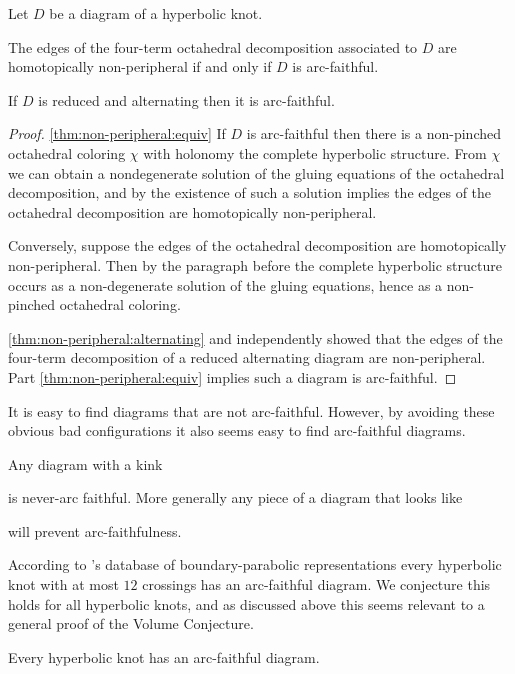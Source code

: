 \documentclass[leqno]{sl2art}
\begin{document}
\begin{corollary}
  \label{thm:non-peripheral}
  Let \(D\) be a diagram of a hyperbolic knot.
  \begin{thmenum}
  \item
    \label{thm:non-peripheral:equiv}
    The edges of the four-term octahedral decomposition associated to \(D\) are homotopically non-peripheral if and only if \(D\) is arc-faithful.
  \item
    \label{thm:non-peripheral:alternating}
    If \(D\) is reduced and alternating then it is arc-faithful.
    \qedhere
  \end{thmenum}
\end{corollary}
\begin{proof}
  \ref{thm:non-peripheral:equiv}
  If \(D\) is arc-faithful then there is a non-pinched octahedral coloring \(\chi\) with holonomy the complete hyperbolic structure.
  From \(\chi\) we can obtain a nondegenerate solution of the gluing equations of the octahedral decomposition, and by \cite[Lemma 3.5]{Dunfield2012} the existence of such a solution implies the edges of the octahedral decomposition are homotopically non-peripheral.
  
  Conversely, suppose the edges of the octahedral decomposition are homotopically non-peripheral.
  Then by the paragraph before \cite[Remark 3.4]{Dunfield2012} the complete hyperbolic structure occurs as a non-degenerate solution of the gluing equations, hence as a non-pinched octahedral coloring.

  \ref{thm:non-peripheral:alternating}
  \textcite{Garoufalidis2016} and \textcite{Sakuma2018} independently showed that the edges of the four-term decomposition of a reduced alternating diagram are non-peripheral.
  Part \ref{thm:non-peripheral:equiv} implies such a diagram is arc-faithful.
\end{proof}

It is easy to find diagrams that are not arc-faithful.
However, by avoiding these obvious bad configurations it also seems easy to find arc-faithful diagrams.

\begin{example}
  Any diagram with a kink
  \begin{center}
    
  \end{center}
  is never-arc faithful.
  More generally any piece of a diagram that looks like
  \begin{center}
    
  \end{center}
  will prevent arc-faithfulness.
\end{example}

According to \citeauthor{DiagramSite}'s database \cite{DiagramSite} of boundary-parabolic representations every hyperbolic knot with at most \(12\) crossings has an arc-faithful diagram.
We conjecture this holds for all hyperbolic knots, and as discussed above this seems relevant to a general proof of the Volume Conjecture.

\begin{conjecture}
  Every hyperbolic knot has an arc-faithful diagram.
\end{conjecture}

\printbibliography[heading=bibintoc,title={Bibliography}]
\end{document}
